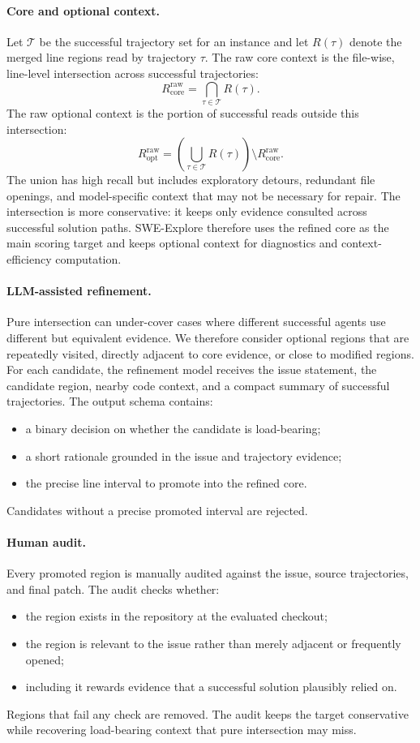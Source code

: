 \documentclass{llmxive}
\begin{document}
\paragraph{Core and optional context.}
Let $\mathcal{T}$ be the successful trajectory set for an instance and let
$R(\tau)$ denote the merged line regions read by trajectory $\tau$. The raw core
context is the file-wise, line-level intersection across successful trajectories:
\[
R^{\mathrm{raw}}_{\mathrm{core}}
=
\bigcap_{\tau \in \mathcal{T}} R(\tau).
\]
The raw optional context is the portion of successful reads outside this
intersection:
\[
R^{\mathrm{raw}}_{\mathrm{opt}}
=
\left(\bigcup_{\tau \in \mathcal{T}} R(\tau)\right)
\setminus R^{\mathrm{raw}}_{\mathrm{core}}.
\]
The union has high recall but includes exploratory detours, redundant file
openings, and model-specific context that may not be necessary for repair. The
intersection is more conservative: it keeps only evidence consulted across
successful solution paths. SWE-Explore therefore uses the refined core as the
main scoring target and keeps optional context for diagnostics and
context-efficiency computation.

\paragraph{LLM-assisted refinement.}
Pure intersection can under-cover cases where different successful agents use
different but equivalent evidence. We therefore consider optional regions that
are repeatedly visited, directly adjacent to core evidence, or close to modified
regions. For each candidate, the refinement model receives the issue statement,
the candidate region, nearby code context, and a compact summary of successful
trajectories. The output schema contains:
\begin{itemize}
    \item a binary decision on whether the candidate is load-bearing;
    \item a short rationale grounded in the issue and trajectory evidence;
    \item the precise line interval to promote into the refined core.
\end{itemize}
Candidates without a precise promoted interval are rejected.

\paragraph{Human audit.}
Every promoted region is manually audited against the issue, source
trajectories, and final patch. The audit checks whether:
\begin{itemize}
    \item the region exists in the repository at the evaluated checkout;
    \item the region is relevant to the issue rather than merely adjacent or frequently opened;
    \item including it rewards evidence that a successful solution plausibly relied on.
\end{itemize}
Regions that fail any check are removed. The audit keeps the target conservative
while recovering load-bearing context that pure intersection may miss.
\end{document}
